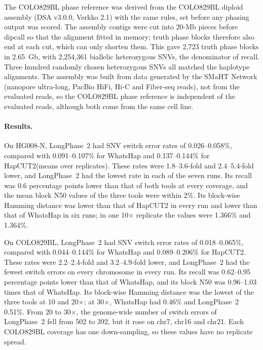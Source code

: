 \documentclass[11pt,a4paper]{article}
\newcommand{\toolname}{LongPhase~2\xspace}
\newcommand{\whatshap}{WhatsHap\xspace}
\newcommand{\hapcut}{HapCUT2\xspace}
\begin{document}
The COLO829BL phase reference was derived from the COLO829BL diploid assembly (DSA v3.0.0, Verkko 2.1)\cite{sohn2026colo829} with the same rules, set before any phasing output was scored. The assembly contigs were cut into 20-Mb pieces before dipcall so that the alignment fitted in memory; truth phase blocks therefore also end at each cut, which can only shorten them. This gave 2,723 truth phase blocks in 2.65~Gb, with 2,254,361 biallelic heterozygous SNVs, the denominator of recall. Three hundred randomly chosen heterozygous SNVs all matched the haplotype alignments. The assembly was built from data generated by the SMaHT Network (nanopore ultra-long, PacBio HiFi, Hi-C and Fiber-seq reads), not from the evaluated reads, so the COLO829BL phase reference is independent of the evaluated reads, although both come from the same cell line.

\paragraph{Results.} On HG008-N, \toolname had SNV switch error rates of 0.026--0.058\%, compared with 0.091--0.107\% for \whatshap and 0.137--0.144\% for \hapcut (means over replicates). These rates were 1.8--3.6-fold and 2.4--5.4-fold lower, and \toolname had the lowest rate in each of the seven runs. Its recall was 0.6 percentage points lower than that of both tools at every coverage, and the mean block N50 values of the three tools were within 2\%. Its block-wise Hamming distance was lower than that of \hapcut in every run and lower than that of \whatshap in six runs; in one 10$\times$ replicate the values were 1.366\% and 1.364\%.

On COLO829BL, \toolname had SNV switch error rates of 0.018--0.065\%, compared with 0.044--0.144\% for \whatshap and 0.089--0.206\% for \hapcut. These rates were 2.2--2.4-fold and 3.2--4.9-fold lower, and \toolname had the fewest switch errors on every chromosome in every run. Its recall was 0.62--0.95 percentage points lower than that of \whatshap, and its block N50 was 0.96--1.03 times that of \whatshap. Its block-wise Hamming distance was the lowest of the three tools at 10 and 20$\times$; at 30$\times$, \whatshap had 0.46\% and \toolname 0.51\%. From 20 to 30$\times$, the genome-wide number of switch errors of \toolname fell from 502 to 392, but it rose on chr7, chr16 and chr21. Each COLO829BL coverage has one down-sampling, so these values have no replicate spread.
\end{document}
